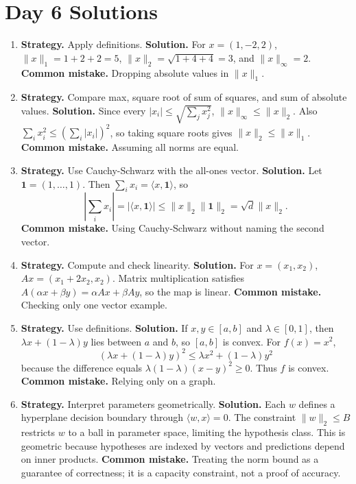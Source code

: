 \documentclass[11pt]{article}
\begin{document}
\section{Day 6 Solutions}
\begin{enumerate}[label=\textbf{6.\arabic*.}]
\item \textbf{Strategy.} Apply definitions. \textbf{Solution.} For $x=(1,-2,2)$, $\|x\|_1=1+2+2=5$, $\|x\|_2=\sqrt{1+4+4}=3$, and $\|x\|_\infty=2$. \textbf{Common mistake.} Dropping absolute values in $\|x\|_1$.

\item \textbf{Strategy.} Compare max, square root of sum of squares, and sum of absolute values. \textbf{Solution.} Since every $|x_i|\le\sqrt{\sum_j x_j^2}$, $\|x\|_\infty\le\|x\|_2$. Also $\sum_i x_i^2\le(\sum_i |x_i|)^2$, so taking square roots gives $\|x\|_2\le\|x\|_1$. \textbf{Common mistake.} Assuming all norms are equal.

\item \textbf{Strategy.} Use Cauchy-Schwarz with the all-ones vector. \textbf{Solution.} Let $\mathbf{1}=(1,\ldots,1)$. Then $\sum_i x_i=\langle x,\mathbf{1}\rangle$, so
\[
|\sum_i x_i|=|\langle x,\mathbf{1}\rangle|\le\|x\|_2\|\mathbf{1}\|_2=\sqrt d\|x\|_2.
\]
\textbf{Common mistake.} Using Cauchy-Schwarz without naming the second vector.

\item \textbf{Strategy.} Compute and check linearity. \textbf{Solution.} For $x=(x_1,x_2)$, $Ax=(x_1+2x_2,x_2)$. Matrix multiplication satisfies $A(\alpha x+\beta y)=\alpha Ax+\beta Ay$, so the map is linear. \textbf{Common mistake.} Checking only one vector example.

\item \textbf{Strategy.} Use definitions. \textbf{Solution.} If $x,y\in[a,b]$ and $\lambda\in[0,1]$, then $\lambda x+(1-\lambda)y$ lies between $a$ and $b$, so $[a,b]$ is convex. For $f(x)=x^2$,
\[
(\lambda x+(1-\lambda)y)^2\le \lambda x^2+(1-\lambda)y^2
\]
because the difference equals $\lambda(1-\lambda)(x-y)^2\ge0$. Thus $f$ is convex. \textbf{Common mistake.} Relying only on a graph.

\item \textbf{Strategy.} Interpret parameters geometrically. \textbf{Solution.} Each $w$ defines a hyperplane decision boundary through $\langle w,x\rangle=0$. The constraint $\|w\|_2\le B$ restricts $w$ to a ball in parameter space, limiting the hypothesis class. This is geometric because hypotheses are indexed by vectors and predictions depend on inner products. \textbf{Common mistake.} Treating the norm bound as a guarantee of correctness; it is a capacity constraint, not a proof of accuracy.
\end{enumerate}
\end{document}
